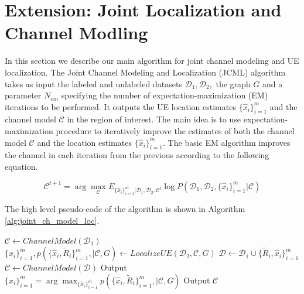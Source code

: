 \documentclass[conference, 10pt]{IEEEtran}
\begin{document}
\section{Extension: Joint Localization and Channel Modling}
\label{sec:extensionalgo}
In this section we describe our main algorithm for joint channel modeling and UE
localization. The Joint Channel Modeling and Localization (JCML) algorithm takes
as input the labeled and unlabeled datasets $\mathcal{D}_1,\mathcal{D}_2,$ the
graph $G$ and a parameter $N_{em}$ specifying the number of
expectation-maximization (EM) iterations to be performed. It outputs the UE
location estimates $\{\hat{x}_i\}_{i=1}^m$ and the channel model $\mathcal{C}$
in the region of interest. The main idea is to use expectation-maximization
procedure to iteratively improve the estimates of both the channel model
$\mathcal{C}$ and the location estimates $\{\hat{x}_i\}_{i=1}^m.$ The basic EM
algorithm improves the channel in each iteration from the previous according to
the following equation.

\begin{equation}
\mathcal{C}^{t+1} = \arg \max_{\mathcal{C}} E_{\{\hat{x}_i\}_{i=1}^m |\mathcal{D}_1,\mathcal{D}_2,\mathcal{C}^t} \log  P(\mathcal{D}_1,\mathcal{D}_2,\{\hat{x}_i\}_{i=1}^m|\mathcal{C}) \label{eq:EM}
\end{equation}

The high level pseudo-code of the algorithm is shown in Algorithm \ref{alg:joint_ch_model_loc}.  


\begin{algorithm}
\caption{$JCML(\mathcal{D}_1, \mathcal{D}_2, G, N_{em})$}
\label{alg:joint_ch_model_loc}
\begin{algorithmic}[1]
\State $\mathcal{C} \gets ChannelModel(\mathcal{D}_1)$
	\State $\{\hat{x}_i\}_{i=1}^m, p(\{\hat{x}_i,\tilde{R}_i\}_{i=1}^m,|\mathcal{C},G) \gets LocalizeUE(\mathcal{D}_2,\mathcal{C},G)$ \label{step:localize}
	\State $\mathcal{D} \gets \mathcal{D}_1 \cup \{\tilde{R}_i,\hat{x}_i\}_{i=1}^m$ \label{line:em_approx}
	\State $\mathcal{C} \gets ChannelModel(\mathcal{D})$
\EndFor
\State Output $\{\hat{x}_i\}_{i=1}^m = \arg \max_{\{\hat{x}_i\}_{i=1}^m} p(\{\hat{x}_i,\tilde{R}_i\}_{i=1}^m,|\mathcal{C},G)$
\State Output $\mathcal{C}$
\end{algorithmic}
\end{algorithm}  
\end{document}
